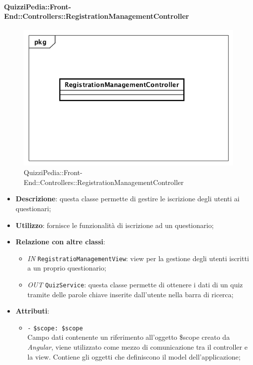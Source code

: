 \begin{itemize}
\paragraph{QuizziPedia::Front-End::Controllers::RegistrationManagementController}
\begin{figure} [ht]
	\centering
	\includegraphics[scale=0.45]{UML/Classi/Front-End/QuizziPedia_Front-end_Controller_RegistrationManagementController.png}
	\caption{QuizziPedia::Front-End::Controllers::RegistrationManagementController}
\end{figure} \FloatBarrier
\begin{itemize}
	\item \textbf{Descrizione}: questa classe permette di gestire le iscrizione degli utenti ai questionari;
	\item \textbf{Utilizzo}: fornisce le funzionalità di iscrizione ad un questionario;
	\item \textbf{Relazione con altre classi}:
	\begin{itemize}
		\item \textit{IN} \texttt{RegistratioManagementView}: view per la gestione degli utenti iscritti a un proprio questionario; 
		\item \textit{OUT} \texttt{QuizService}: questa classe permette di ottenere i dati di un quiz tramite delle parole chiave inserite dall'utente nella barra di ricerca;
	\end{itemize}
	\item \textbf{Attributi}:
	\begin{itemize}
		\item \texttt{-} \texttt{\$scope: \$scope} \\
		Campo dati contenente un riferimento all’oggetto \$scope creato da \textit{Angular}, viene utilizzato come mezzo di comunicazione tra il controller e la view. Contiene gli oggetti che definiscono il model dell’applicazione;

\end{itemize}
\end{itemize}
\end{itemize}
